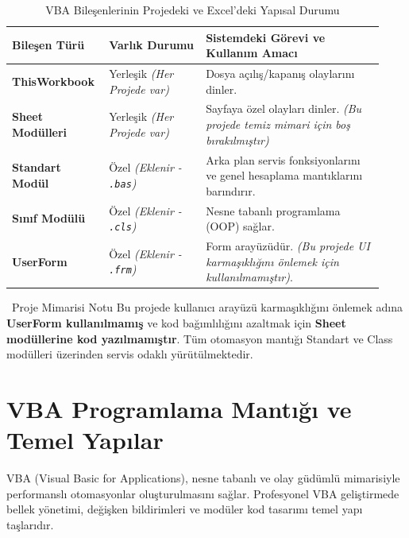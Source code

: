 \begin{table}[h!]
\centering
\small
\begin{tabular}{p{0.22\linewidth} p{0.25\linewidth} p{0.46\linewidth}}
\toprule
\textbf{Bileşen Türü} & \textbf{Varlık Durumu} & \textbf{Sistemdeki Görevi ve Kullanım Amacı} \\
\midrule
\textbf{ThisWorkbook} & Yerleşik \textit{(Her Projede var)} & Dosya açılış/kapanış olaylarını dinler.\\
\textbf{Sheet Modülleri} & Yerleşik \textit{(Her Projede var)} & Sayfaya özel olayları dinler. \textit{(Bu projede temiz mimari için boş bırakılmıştır)} \\
\textbf{Standart Modül} & Özel \textit{(Eklenir - \texttt{.bas})} & Arka plan servis fonksiyonlarını ve genel hesaplama mantıklarını barındırır. \\
\textbf{Sınıf Modülü} & Özel \textit{(Eklenir - \texttt{.cls})} & Nesne tabanlı programlama (OOP) sağlar. \\
\textbf{UserForm} & Özel \textit{(Eklenir - \texttt{.frm})} & Form arayüzüdür. \textit{(Bu projede UI karmaşıklığını önlemek için kullanılmamıştır)}. \\
\bottomrule
\end{tabular}
\caption{VBA Bileşenlerinin Projedeki ve Excel'deki Yapısal Durumu}
\end{table}

\begin{warningbox}{\faExclamationCircle\ Proje Mimarisi Notu}
Bu projede kullanıcı arayüzü karmaşıklığını önlemek adına \textbf{UserForm kullanılmamış} ve kod bağımlılığını azaltmak için \textbf{Sheet modüllerine kod yazılmamıştır}. Tüm otomasyon mantığı Standart ve Class modülleri üzerinden servis odaklı yürütülmektedir.
\end{warningbox}

\newpage


\section{VBA Programlama Mantığı ve Temel Yapılar}

VBA (Visual Basic for Applications), nesne tabanlı ve olay güdümlü mimarisiyle performanslı otomasyonlar oluşturulmasını sağlar. Profesyonel VBA geliştirmede bellek yönetimi, değişken bildirimleri ve modüler kod tasarımı temel yapı taşlarıdır.

